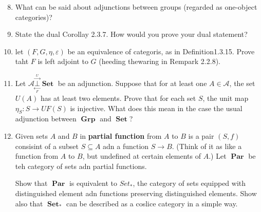 \documentclass[12pt,a4paper]{report}
\newcommand{\ADJOINT}[2]{\underset{\underset{#2}\longleftarrow}{\overset{\overset{#1}\longrightarrow}\bot }}
\newcommand{\CAT}[1]{\mathscr{#1}}
\newcommand{\CATSET}[1]{\operatorname{\textbf{#1}}}
\begin{document}
\begin{enumerate}[label=\textbf{2.3.\arabic*}]
\setcounter{enumi}{7}
	\item What can be said about adjunctions between groups (regarded as one-object categories)?
	
	\item State the dual Corollay 2.3.7.  How would you prove your dual statement?
	
	\item let $(F,G,\eta,\varepsilon)$ be an equivalence of categoris, as in Definition1.3.15.  Prove taht $F$ is left adjoint to $G$ (heeding thewaring in Rempark 2.2.8).
	
	\item Let $\CAT{A}\ADJOINT{U}{F}\CATSET{Set}$ be an adjunction.  Suppose that for at least one $A\in \CAT{A}$, the set $U(A)$ has at least two elements. Prove that for each set $S$, the unit map $\eta_S:S\to UF(S)$ is injective.  What does this mean in the case the usual adjunction between $\CATSET{Grp}$ and $\CATSET{Set}$?
	
	\item Given sets $A$ and $B$ in \textbf{partial function} from $A$ to $B$ is a pair $(S,f)$ consisint of a subset $S \subseteq A$ adn a function $S \to B$.  (Think of it as like a function from $A$ to $B$, but undefined at certain elements of $A$.)  Let $\CATSET{Par}$ be teh category of sets adn partial functions. 
	
	Show that $\CATSET{Par}$ is equivalent to $Set_*$, the category of sets equipped with distinguished element adn functions preserving distinguished elements.  Show also that $\CATSET{Set}_*$ can be described as a coslice category in a simple way.

\end{enumerate}
\end{document}
